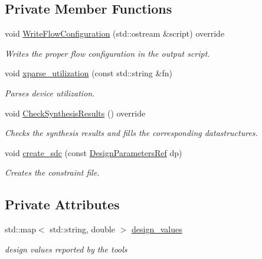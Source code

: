 \subsection*{Private Member Functions}
\begin{DoxyCompactItemize}
\item 
void \hyperlink{classLatticeBackendFlow_aa0695e294b18773a1ec27fe86cf16408}{Write\+Flow\+Configuration} (std\+::ostream \&script) override
\begin{DoxyCompactList}\small\item\em Writes the proper flow configuration in the output script. \end{DoxyCompactList}\item 
void \hyperlink{classLatticeBackendFlow_af95e74925a7a7c8f6e770fa99f62481b}{xparse\+\_\+utilization} (const std\+::string \&fn)
\begin{DoxyCompactList}\small\item\em Parses device utilization. \end{DoxyCompactList}\item 
void \hyperlink{classLatticeBackendFlow_a31267aeb4a44638daab713102fe01306}{Check\+Synthesis\+Results} () override
\begin{DoxyCompactList}\small\item\em Checks the synthesis results and fills the corresponding datastructures. \end{DoxyCompactList}\item 
void \hyperlink{classLatticeBackendFlow_a18902a5390c3be6efb6833d35f0f1d23}{create\+\_\+sdc} (const \hyperlink{DesignParameters_8hpp_ae36bb1c4c9150d0eeecfe1f96f42d157}{Design\+Parameters\+Ref} dp)
\begin{DoxyCompactList}\small\item\em Creates the constraint file. \end{DoxyCompactList}\end{DoxyCompactItemize}
\subsection*{Private Attributes}
\begin{DoxyCompactItemize}
\item 
std\+::map$<$ std\+::string, double $>$ \hyperlink{classLatticeBackendFlow_a2980298887193f63d6b1aa0ab64db340}{design\+\_\+values}
\begin{DoxyCompactList}\small\item\em design values reported by the tools \end{DoxyCompactList}\end{DoxyCompactItemize}
